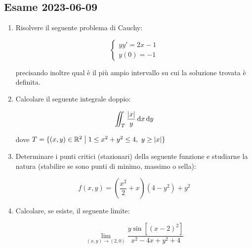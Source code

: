 \subsection{Esame 2023{-}06{-}09}

\begin{enumerate}
    \itemsep32pt
    \item Risolvere il seguente problema di Cauchy:

          \begin{equation*}
              \begin{cases}
                  yy' = 2x - 1 \\
                  y(0) = -1
              \end{cases}
          \end{equation*}

          precisando inoltre qual è il più ampio intervallo su cui la soluzione trovata è definita.

    \item Calcolare il seguente integrale doppio:

          \[
              \iint_{T} \frac{|x|}{y} \mathop{}\!\mathrm{d}{x}\mathop{}\!\mathrm{d}{y}
          \]

          dove \(T = \{(x,y) \in \mathbb{R}^{2} \;\big|\; 1 \le x^2 + y^2 \le 4,\ y \ge |x|\} \)

    \item Determinare i punti critici (stazionari) della seguente funzione e studiarne la natura (stabilire se sono punti di minimo, massimo o sella):

          \[
              f(x,y) = \left(\frac{x^2}{2}+x\right) (4-y^2) +y^2
          \]

    \item Calcolare, se esiste, il seguente limite:

          \[
              \lim_{(x,y) \rightarrow (2,0)}
              \frac
              {y\sin[{(x-2)}^2]}
              {x^2 - 4x + y^2 + 4}
          \]

\end{enumerate}
